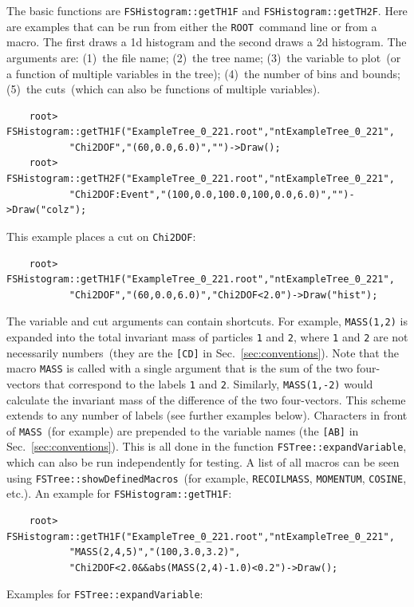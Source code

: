 \documentclass[11pt]{article}
\newcommand{\ROOT}{{\tt ROOT}}
\begin{document}
The basic functions are {\tt FSHistogram::getTH1F} and {\tt FSHistogram::getTH2F}.  Here are examples that can be run from either the \ROOT\ command line or from a macro.  The first draws a 1d histogram and the second draws a 2d histogram.  The arguments are: (1)~the file name; (2)~the tree name; (3)~the variable to plot~(or a function of multiple variables in the tree); (4)~the number of bins and bounds; (5)~the cuts~(which can also be functions of multiple variables).
\begin{verbatim}
    root> FSHistogram::getTH1F("ExampleTree_0_221.root","ntExampleTree_0_221",
           "Chi2DOF","(60,0.0,6.0)","")->Draw();
    root> FSHistogram::getTH2F("ExampleTree_0_221.root","ntExampleTree_0_221",
           "Chi2DOF:Event","(100,0.0,100.0,100,0.0,6.0)","")->Draw("colz");
\end{verbatim}
This example places a cut on {\tt Chi2DOF}:
\begin{verbatim}
    root> FSHistogram::getTH1F("ExampleTree_0_221.root","ntExampleTree_0_221",
           "Chi2DOF","(60,0.0,6.0)","Chi2DOF<2.0")->Draw("hist");
\end{verbatim}
The variable and cut arguments can contain shortcuts.  For example, {\tt MASS(1,2)} is expanded into the total invariant mass of particles {\tt 1} and {\tt 2}, where {\tt 1} and {\tt 2} are not necessarily numbers~(they are the {\tt [CD]} in Sec.~\ref{sec:conventions}).  Note that the macro {\tt MASS} is called with a single argument that is the sum of the two four-vectors that correspond to the labels {\tt 1} and {\tt 2}.  Similarly, {\tt MASS(1,-2)} would calculate the invariant mass of the difference of the two four-vectors.  This scheme extends to any number of labels (see further examples below).  Characters in front of {\tt MASS}~(for example) are prepended to the variable names (the {\tt [AB]} in Sec.~\ref{sec:conventions}).  This is all done in the function {\tt FSTree::expandVariable}, which can also be run independently for testing.  
A list of all macros can be seen using {\tt FSTree::showDefinedMacros}~(for example, {\tt RECOILMASS}, {\tt MOMENTUM}, {\tt COSINE}, etc.).  An example for {\tt FSHistogram::getTH1F}:
\begin{verbatim}
    root> FSHistogram::getTH1F("ExampleTree_0_221.root","ntExampleTree_0_221",
           "MASS(2,4,5)","(100,3.0,3.2)",
           "Chi2DOF<2.0&&abs(MASS(2,4)-1.0)<0.2")->Draw();
\end{verbatim}
Examples for {\tt FSTree::expandVariable}:
\end{document}
